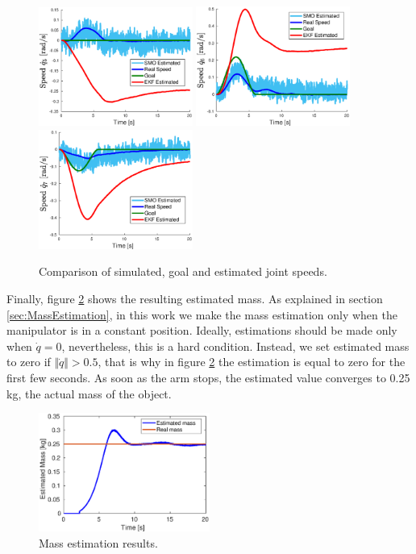 \documentclass[a4paper, 10pt]{article}
\begin{document}
\begin{figure}
  \includegraphics[width=0.45\textwidth]{Figures/result_qp5.eps}
  \includegraphics[width=0.45\textwidth]{Figures/result_qp6.eps}
  \includegraphics[width=0.45\textwidth]{Figures/result_qp7.eps}
  \caption{Comparison of simulated, goal and estimated joint speeds.}
  \label{fig:result_qp}
\end{figure}

Finally, figure \ref{fig:MassEstimation} shows the resulting estimated mass. As explained in section \ref{sec:MassEstimation}, in this work we make the mass estimation only when the manipulator is in a constant position. Ideally, estimations should be made only when $\dot{q}=0$, nevertheless, this is a hard condition. Instead, we set estimated mass to zero if $\Vert\dot{q}\Vert > 0.5$, that is why in figure \ref{fig:MassEstimation} the estimation is equal to zero for the first few seconds. As soon as the arm stops, the estimated value converges to 0.25 kg, the actual mass of the object. 
\begin{figure}
  \centering
  \includegraphics[width=0.5\textwidth]{Figures/result_mass.eps}
  \caption{Mass estimation results.}
  \label{fig:MassEstimation}
\end{figure}
\end{document}
